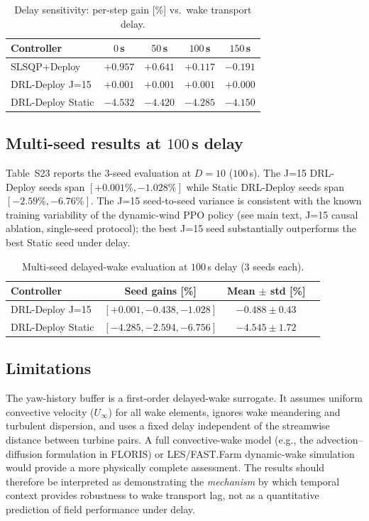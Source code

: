 \documentclass{article}
\begin{document}
\begin{table}[h]
\centering
\caption{Delay sensitivity: per-step gain [\%] vs.\ wake transport delay.}
\label{tab:delay_sens}
\small
\begin{tabular}{lcccc}
\toprule
Controller & $0$\,s & $50$\,s & $100$\,s & $150$\,s \\
\midrule
SLSQP+Deploy       & $+0.957$ & $+0.641$ & $+0.117$ & $-0.191$ \\
DRL-Deploy J=15    & $+0.001$ & $+0.001$ & $+0.001$ & $+0.000$ \\
DRL-Deploy Static  & $-4.532$ & $-4.420$ & $-4.285$ & $-4.150$ \\
\bottomrule
\end{tabular}
\end{table}

\subsection{Multi-seed results at $100$\,s delay}

Table~S23 reports the 3-seed evaluation at $D{=}10$ ($100$\,s). The J=15 DRL-Deploy seeds span $[+0.001\%, -1.028\%]$ while Static DRL-Deploy seeds span $[-2.59\%, -6.76\%]$. The J=15 seed-to-seed variance is consistent with the known training variability of the dynamic-wind PPO policy (see main text, J=15 causal ablation, single-seed protocol); the best J=15 seed substantially outperforms the best Static seed under delay.

\begin{table}[h]
\centering
\caption{Multi-seed delayed-wake evaluation at $100$\,s delay (3 seeds each).}
\label{tab:delay_multiseed}
\small
\begin{tabular}{lccc}
\toprule
Controller & Seed gains [\%] & Mean $\pm$ std [\%] \\
\midrule
DRL-Deploy J=15    & $[+0.001, -0.438, -1.028]$ & $-0.488 \pm 0.43$ \\
DRL-Deploy Static  & $[-4.285, -2.594, -6.756]$ & $-4.545 \pm 1.72$ \\
\bottomrule
\end{tabular}
\end{table}

\subsection{Limitations}

The yaw-history buffer is a first-order delayed-wake surrogate. It assumes uniform convective velocity ($U_\infty$) for all wake elements, ignores wake meandering and turbulent dispersion, and uses a fixed delay independent of the streamwise distance between turbine pairs. A full convective-wake model (e.g., the advection--diffusion formulation in FLORIS) or LES/FAST.Farm dynamic-wake simulation would provide a more physically complete assessment. The results should therefore be interpreted as demonstrating the \emph{mechanism} by which temporal context provides robustness to wake transport lag, not as a quantitative prediction of field performance under delay.
\end{document}
